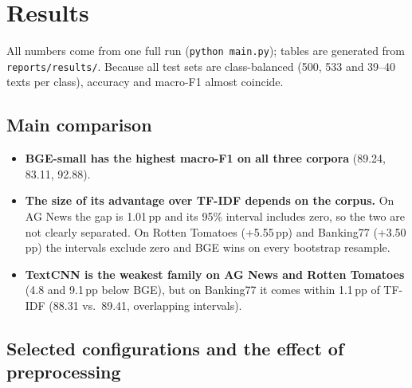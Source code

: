 \section{Results}
\label{sec:results}

All numbers come from one full run (\texttt{python main.py}); tables are generated from \texttt{reports/results/}. Because all test sets are class-balanced (500, 533 and 39--40 texts per class), accuracy and macro-F1 almost coincide.

\subsection{Main comparison}




\begin{itemize}
  \item \textbf{BGE-small has the highest macro-F1 on all three corpora} (89.24, 83.11, 92.88).
  \item \textbf{The size of its advantage over TF-IDF depends on the corpus.} On AG News the gap is 1.01\,pp and its 95\% interval includes zero, so the two are not clearly separated. On Rotten Tomatoes (+5.55\,pp) and Banking77 (+3.50\,pp) the intervals exclude zero and BGE wins on every bootstrap resample.
  \item \textbf{TextCNN is the weakest family on AG News and Rotten Tomatoes} (4.8 and 9.1\,pp below BGE), but on Banking77 it comes within 1.1\,pp of TF-IDF (88.31 vs.\ 89.41, overlapping intervals).
\end{itemize}

\subsection{Selected configurations and the effect of preprocessing}




